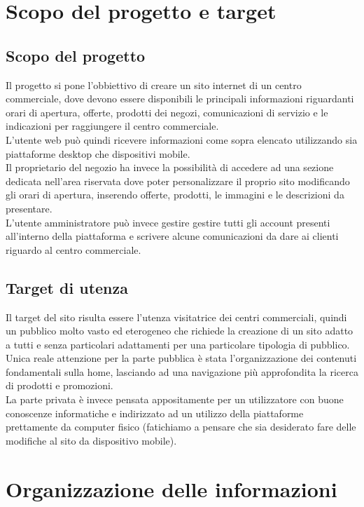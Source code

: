 \documentclass[a4paper,12pt]{article}
\begin{document}
\section{Scopo del progetto e target}
\subsection{Scopo del progetto}
Il progetto si pone l'obbiettivo di creare un sito internet di un centro commerciale, dove devono essere disponibili le principali informazioni riguardanti orari di apertura, offerte, prodotti dei negozi, comunicazioni di servizio e le indicazioni per raggiungere il centro commerciale. \\
L'utente web può quindi ricevere informazioni come sopra elencato utilizzando sia piattaforme desktop che dispositivi mobile.\\
Il proprietario del negozio ha invece la possibilità di accedere ad una sezione dedicata nell'area riservata dove poter personalizzare il proprio sito modificando gli orari di apertura, inserendo offerte, prodotti, le immagini e le descrizioni da presentare.\\
L'utente amministratore può invece gestire gestire tutti gli account presenti all'interno della piattaforma e scrivere alcune comunicazioni da dare ai clienti riguardo al centro commerciale.\\
\subsection{Target di utenza}
Il target del sito risulta essere l'utenza visitatrice dei centri commerciali, quindi un pubblico molto vasto ed eterogeneo che richiede la creazione di un sito adatto a tutti e senza particolari adattamenti per una particolare tipologia di pubblico.\\
Unica reale attenzione per la parte pubblica è stata l'organizzazione dei contenuti fondamentali sulla home, lasciando ad una navigazione più approfondita la ricerca di prodotti e promozioni.\\
La parte privata è invece pensata appositamente per un utilizzatore con buone conoscenze informatiche e indirizzato ad un utilizzo della piattaforme prettamente da computer fisico (fatichiamo a pensare che sia desiderato fare delle modifiche al sito da dispositivo mobile).
\section{Organizzazione delle informazioni}
\end{document}
